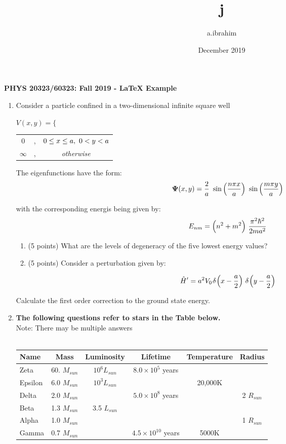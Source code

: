 \documentclass[12pt]{article}
\title{j}
\author{a.ibrahim }
\date{December 2019}
\begin{document}
\thispagestyle{empty}
\begin{center}
\textbf{PHYS  20323/60323: Fall 2019 - LaTeX Example}
\end{center}

\noindent 
\begin{enumerate}
\item Consider a particle confined in a two-dimensional infinite square well  
\begin{center}
$V(x,y)=\Big\{$
\begin{tabular}{@{}c @{}l c}
    0 & , & $0\leq x\leq a, \textnormal{ } 0<y<a$\\
    $\infty$ & , & \textit{otherwise}
\end{tabular}
\end{center}

The eigenfunctions have the form:
$$\mathbf{\Psi} (x,y)=\frac{2}{a} \textnormal{ } \sin \Big( \frac{n\pi x}{a} \Big) \textnormal{ } \sin \Big( \frac{m\pi y}{a} \Big)$$

with the corresponding energis being given by:
$$E_{nm}=\Big( n^2+m^2\Big) \textnormal{ } \frac{\pi^2 \hbar^2}{2ma^2}$$

\begin{enumerate}
    \item (5 points) What are the levels of degeneracy of the five lowest energy values?
    \item (5 points) Consider a perturbation given by:
\end{enumerate}

$$\hat{H}' =a^2V_0 \hspace{.01in} \delta \hspace{.01in} \Big( x-\frac{a}{2} \Big) \textnormal{ } \delta \hspace{.01in} \Big( y-\frac{a}{2} \Big)$$

\hspace {.35in} Calculate the first order correction to the ground state energy.\vspace{.3in}

\item \textbf{The following questions refer to stars in the Table below.}\\
Note:  There may be multiple answers\\~\\
\begin{tabular}{|l|c|c|c|c|c|}
\hline
Name & Mass & Luminosity & Lifetime & Temperature & Radius\\
\hline
Zeta & 60. $M_{sun}$ & $10^6 L_{sun}$ & $8.0\times 10^5$ years & & \\
\hline
Epsilon & 6.0 $M_{sun}$ & $10^3 L_{sun}$ & & 20,000K & \\
\hline
Delta & 2.0 $M_{sun}$ & & $5.0\times 10^8$ years & & 2 $R_{sun}$ \\
\hline
Beta & 1.3 $M_{sun}$ & 3.5 $L_{sun}$ & & & \\
\hline
Alpha & 1.0 $M_{sun}$ & & & & 1 $R_{sun}$ \\
\hline
Gamma & 0.7 $M_{sun}$ & & $4.5\times 10^{10}$ years & 5000K & \\
\hline
\end{tabular}


\end{enumerate}
\end{document}
